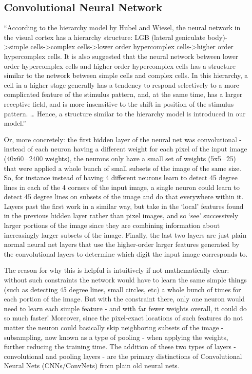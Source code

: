 \subsection{Convolutional Neural Network}

“According to the hierarchy model by Hubel and Wiesel, the neural network in the visual cortex has a hierarchy structure: LGB (lateral geniculate body)->simple cells->complex cells->lower order hypercomplex cells->higher order hypercomplex cells. It is also suggested that the neural network between lower order hypercomplex cells and higher order hypercomplex cells has a structure similar to the network between simple cells and complex cells. In this hierarchy, a cell in a higher stage generally has a tendency to respond selectively to a more complicated feature of the stimulus pattern, and, at the same time, has a larger receptive field, and is more insensitive to the shift in position of the stimulus pattern. … Hence, a structure similar to the hierarchy model is introduced in our model.”

Or, more concretely: the first hidden layer of the neural net was convolutional - instead of each neuron having a different weight for each pixel of the input image (40x60=2400 weights), the neurons only have a small set of weights (5x5=25) that were applied a whole bunch of small subsets of the image of the same size. So, for instance instead of having 4 different neurons learn to detect 45 degree lines in each of the 4 corners of the input image, a single neuron could learn to detect 45 degree lines on subsets of the image and do that everywhere within it. Layers past the first work in a similar way, but take in the ‘local’ features found in the previous hidden layer rather than pixel images, and so ‘see’ successively larger portions of the image since they are combining information about increasingly larger subsets of the image. Finally, the last two layers are just plain normal neural net layers that use the higher-order larger features generated by the convolutional layers to determine which digit the input image corresponds to.

The reason for why this is helpful is intuitively if not mathematically clear: without such constraints the network would have to learn the same simple things (such as detecting 45 degree lines, small circles, etc) a whole bunch of times for each portion of the image. But with the constraint there, only one neuron would need to learn each simple feature - and with far fewer weights overall, it could do so much faster! Moreover, since the pixel-exact locations of such features do not matter the neuron could basically skip neighboring subsets of the image - subsampling, now known as a type of pooling - when applying the weights, further reducing the training time. The addition of these two types of layers - convolutional and pooling layers - are the primary distinctions of Convolutional Neural Nets (CNNs/ConvNets) from plain old neural nets.


